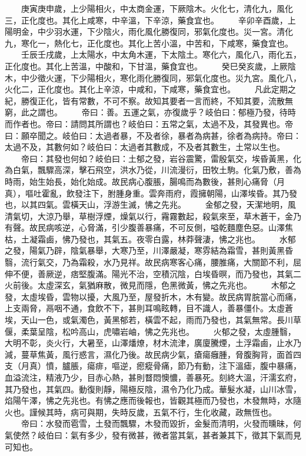 　　庚寅庚申歲，上少陽相火，中太商金運，下厥陰木。火化七，清化九，風化三，正化度也。其化上咸寒，中辛溫，下辛涼，藥食宜也。
　　辛卯辛酉歲，上陽明金，中少羽水運，下少陰火，雨化風化勝復同，邪氣化度也。災一宮。清化九，寒化一，熱化七，正化度也。其化上苦小溫，中苦和，下咸寒，藥食宜也。
　　壬辰壬戌歲，上太陽水，中太角木運，下太陰土。寒化六，風化八，雨化五，正化度也。其化上苦溫，中酸和，下甘溫，藥食宜也。
　　癸巳癸亥歲，上厥陰木，中少徵火運，下少陽相火，寒化雨化勝復同，邪氣化度也。災九宮。風化八，火化二，正化度也。其化上辛涼，中咸和，下咸寒，藥食宜也。
　　凡此定期之紀，勝復正化，皆有常數，不可不察。故知其要者一言而終，不知其要，流散無窮，此之謂也。
　　帝曰：善。五運之氣，亦復歲乎？岐伯曰：郁極乃發，待時而作者也。帝曰：請問其所謂也？岐伯曰：五常之氣，太過不及，其發異也。帝曰：願卒聞之。岐伯曰：太過者暴，不及者徐，暴者為病甚，徐者為病持。帝曰：太過不及，其數何如？岐伯曰：太過者其數成，不及者其數生，土常以生也。
　　帝曰：其發也何如？岐伯曰：土郁之發，岩谷震驚，雷殷氣交，埃昏黃黑，化為白氣，飄驟高深，擊石飛空，洪水乃從，川流漫衍，田牧土駒。化氣乃敷，善為時雨，始生始長，始化始成。故民病心腹脹，腸鳴而為數後，甚則心痛脅（月真），嘔吐霍亂，飲發注下，胕腫身重。雲奔雨府，霞擁朝陽，山澤埃昏。其乃發也，以其四氣。雲橫天山，浮游生滅，怫之先兆。
　　金郁之發，天潔地明，風清氣切，大涼乃舉，草樹浮煙，燥氣以行，霿霧數起，殺氣來至，草木蒼干，金乃有聲。故民病咳逆，心脅滿，引少腹善暴痛，不可反側，嗌乾麵塵色惡。山澤焦枯，土凝霜鹵，怫乃發也，其氣五。夜零白露，林莽聲淒，怫之兆也。
　　水郁之發，陽氣乃辟，陰氣暴舉，大寒乃至，川澤嚴凝，寒雰結為霜雪，甚則黃黑昏翳，流行氣交，乃為霜殺，水乃見祥。故民病寒客心痛，腰脽痛，大關節不利，屈伸不便，善厥逆，痞堅腹滿。陽光不治，空積沉陰，白埃昏暝，而乃發也，其氣二火前後。太虛深玄，氣猶麻散，微見而隱，色黑微黃，怫之先兆也。
　　木郁之發，太虛埃昏，雲物以擾，大風乃至，屋發折木，木有變。故民病胃脘當心而痛，上支兩脅，鬲咽不通，食飲不下，甚則耳鳴眩轉，目不識人，善暴僵仆。太虛蒼埃，天山一色，或氣濁色，黃黑郁若，橫雲不起，雨而乃發也，其氣無常。長川草偃，柔葉呈陰，松吟高山，虎嘯岩岫，怫之先兆也。
　　火郁之發，太虛腫翳，大明不彰，炎火行，大暑至，山澤燔燎，材木流津，廣廈騰煙，土浮霜鹵，止水乃減，蔓草焦黃，風行惑言，濕化乃後。故民病少氣，瘡瘍癰腫，脅腹胸背，面首四支（月真）憤，臚脹，瘍痱，嘔逆，瘛瘲骨痛，節乃有動，注下溫瘧，腹中暴痛，血溢流注，精液乃少，目赤心熱，甚則瞀悶懊憹，善暴死。刻終大溫，汗濡玄府，其乃發也，其氣四。動復則靜，陽極反陰，濕令乃化乃成。華髮水凝，山川冰雪，焰陽午澤，怫之先兆也。有怫之應而後報也，皆觀其極而乃發也，木發無時，水隨火也。謹候其時，病可與期，失時反歲，五氣不行，生化收藏，政無恆也。
　　帝曰：水發而雹雪，土發而飄驟，木發而毀折，金髮而清明，火發而曛昧，何氣使然？岐伯曰：氣有多少，發有微甚，微者當其氣，甚者兼其下，徵其下氣而見可知也。
